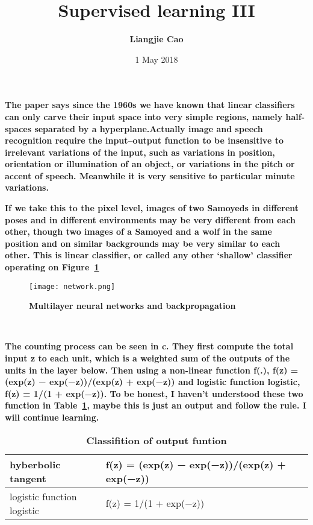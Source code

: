 \documentclass[5pt]{article}
\begin{document}
\title{\textbf{Supervised learning III}}
\author{\textbf{Liangjie Cao}}
\date{1 May 2018}
\maketitle
\par
\textbf{The paper says since the 1960s we have known that linear classifiers can only carve their input space into very simple regions, namely half-spaces separated by a hyperplane.Actually image and speech recognition require the input–output function to be insensitive to irrelevant variations of the input, such as variations in position, orientation or illumination of an object, or variations in the pitch or accent of speech. Meanwhile it is very sensitive to particular minute variations.\cite{name1} }\\
\par
\textbf{If we take this to the pixel level, images of two Samoyeds in different poses and in different environments may be very different from each other, though two images of a Samoyed and a wolf in the same position and on similar backgrounds may be very similar to each other. This is linear classifier, or called any other ‘shallow’ classifier operating on Figure~\ref{Figure}}
 \begin{figure}[ht]
 \centering
 \texttt{[image: network.png]}\\
 \caption{\textbf{Multilayer neural networks and backpropagation}}\label{Figure}
\end{figure}\\
\par
\textbf{The counting process can be seen in \textbf{c}. They first compute the total input z to each unit, which is a weighted sum of the outputs of the units in the layer below.  Then using a non-linear function f(.), f(z) = (exp(z) − exp(−z))/(exp(z) + exp(−z)) and logistic function logistic, f(z) = 1/(1 + exp(−z)). To be honest, I haven't understood these two function in Table~\ref{Table}, maybe this is just an output and follow the rule. I will continue learning.}\\
 \begin{table}[!htbp]
  \centering
 \begin{tabular}{|p{3cm}|p{4cm}|p{3cm}}
   \hline
     hyberbolic tangent &  f(z) = (exp(z) − exp(−z))/(exp(z) + exp(−z))\\
  \hline
     logistic function logistic &  f(z) = 1/(1 + exp(−z))\\
   \hline
  \end{tabular}
  \caption{\textbf{Classifition of output funtion}} \label{Table}
  \end{table}


\end{document}
